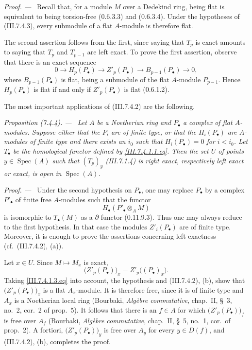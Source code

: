 \documentclass[10pt,oneside]{book}
\newcommand{\Spec}{\operatorname{Spec}}
\newcommand{\sref}[2][]{(#2)}
\newcommand{\oldpage}[2][]{\setcounter{footnote}{0}\marginpar{\scriptsize\textbf{#1}~|~#2}\ignorespaces}
\newenvironment{proposition}[1][]{\par\medskip\noindent\itshape Proposition (#1). ---\ }{\par}
\newenvironment{proof}{\par\medskip\noindent\textit{Proof. ---\ }}{\par}
\begin{document}
\begin{proof}
Recall that, for a module $M$ over a Dedekind ring, being flat
is equivalent to being torsion-free \sref[0]{0.6.3.3} and
\sref[0]{0.6.3.4}.  Under the hypotheses of
\sref{III.7.4.3}, every submodule of a flat $A$-module is
therefore flat.

The second assertion follows from the first, since saying that
$T_p$ is exact amounts to saying that $T_p$ and $T_{p-1}$ are
left exact.  To prove the first assertion, observe that there
is an exact sequence
\[
  0
  \longrightarrow H_p(P_\bullet)
  \longrightarrow Z'_p(P_\bullet)
  \longrightarrow B_{p-1}(P_\bullet)
  \longrightarrow 0,
\]
where $B_{p-1}(P_\bullet)$ is flat, being a submodule of the
flat $A$-module $P_{p-1}$.  Hence $H_p(P_\bullet)$ is flat if
and only if $Z'_p(P_\bullet)$ is flat
\sref[0]{0.6.1.2}.
\end{proof}

The most important applications of \sref{III.7.4.2} are the
following.

\begin{proposition}[7.4.4]
\label{III.7.4.4}
Let $A$ be a Noetherian ring and $P_\bullet$ a complex of flat
$A$-modules.  Suppose either that the $P_i$ are of finite
type, or that the $H_i(P_\bullet)$ are $A$-modules of finite
type and there exists an $i_0$ such that
$H_i(P_\bullet)=0$ for $i<i_0$.  Let $T_\bullet$ be the
homological functor defined by \eqref{III.7.4.1.1.eq}.  Then
the set $U$ of points $y\in\Spec(A)$ such that $(T_p)_y$
\sref{III.7.1.4} is right exact, respectively left exact or
exact, is open in $\Spec(A)$.
\end{proposition}

\begin{proof}
\oldpage[III]{188}
Under the second hypothesis on $P_\bullet$, one may replace
$P_\bullet$ by a complex $P'_\bullet$ of finite free
$A$-modules such that the functor
\[
  H_\bullet(P'_\bullet\otimes_A M)
\]
is isomorphic to $T_\bullet(M)$ as a $\partial$-functor
\sref[0]{0.11.9.3}.  Thus one may always reduce to the first
hypothesis.  In that case the modules $Z'_i(P_\bullet)$ are of
finite type.  Moreover, it is enough to prove the assertions
concerning left exactness (cf.\ \sref{III.7.4.2}, (a)).

Let $x\in U$.  Since $M\mapsto M_x$ is exact,
\[
  \bigl(Z'_p(P_\bullet)\bigr)_x
  =
  Z'_p\bigl((P_\bullet)_x\bigr).
\]
Taking \eqref{III.7.4.1.3.eq} into account, the hypothesis and
\sref{III.7.4.2}, (b), show that
$\bigl(Z'_p(P_\bullet)\bigr)_x$ is a flat $A_x$-module.  It is
therefore free, since it is of finite type and $A_x$ is a
Noetherian local ring (Bourbaki,
\emph{Alg\`ebre commutative}, chap.~II, \S~3, no.~2, cor.~2
of prop.~5).  It follows that there is an $f\in A$ for which
$\bigl(Z'_p(P_\bullet)\bigr)_f$ is free over $A_f$
(Bourbaki, \emph{Alg\`ebre commutative}, chap.~II, \S~5,
no.~1, cor.\ of prop.~2).  A fortiori,
$\bigl(Z'_p(P_\bullet)\bigr)_y$ is free over $A_y$ for every
$y\in D(f)$, and \sref{III.7.4.2}, (b), completes the proof.
\end{proof}
\end{document}
